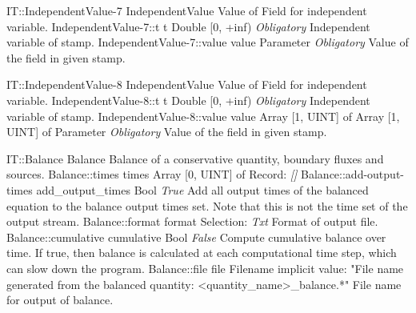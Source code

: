 \begin{TupleType}
	{IT::IndependentValue-7}
	{IndependentValue}
	{} %
	{} %
	{{{Value of Field for independent variable.}}}
		\RecKey
			{IndependentValue-7::t}
			{t}
			{{Double [0, +inf)}}
			{ \it{Obligatory} }
			{{{Independent variable of stamp.}}}
		\RecKey
			{IndependentValue-7::value}
			{value}
			{{Parameter}}
			{ \it{Obligatory} }
			{{{Value of the field in given stamp.}}}
\end{TupleType}
\begin{TupleType}
	{IT::IndependentValue-8}
	{IndependentValue}
	{} %
	{} %
	{{{Value of Field for independent variable.}}}
		\RecKey
			{IndependentValue-8::t}
			{t}
			{{Double [0, +inf)}}
			{ \it{Obligatory} }
			{{{Independent variable of stamp.}}}
		\RecKey
			{IndependentValue-8::value}
			{value}
			{{Array [1, UINT] of }{Array [1, UINT] of }{Parameter}}
			{ \it{Obligatory} }
			{{{Value of the field in given stamp.}}}
\end{TupleType}
\begin{RecordType}
	{IT::Balance}
	{Balance}
	{} %
	{} %
	{{{Balance of a conservative quantity, boundary fluxes and sources.}}}
		\RecKey
			{Balance::times}
			{times}
			{{Array [0, UINT] of }{Record}{: }}
			{ \it{[]} }
			{}
		\RecKey
			{Balance::add-output-times}
			{add{\_}output{\_}times}
			{{Bool}}
			{ \it{True} }
			{{{Add all output times of the balanced equation to the balance output times set. Note that this is not the time set of the output stream.}}}
		\RecKey
			{Balance::format}
			{format}
			{{Selection}{: }}
			{ \it{Txt} }
			{{{Format of output file.}}}
		\RecKey
			{Balance::cumulative}
			{cumulative}
			{{Bool}}
			{ \it{False} }
			{{{Compute cumulative balance over time. If true, then balance is calculated at each computational time step, which can slow down the program.}}}
		\RecKey
			{Balance::file}
			{file}
			{{Filename}}
			{implicit value: "{File name generated from the balanced quantity: {\textless}quantity{\_}name{\textgreater}{\_}balance.*}"}
			{{{File name for output of balance.}}}
\end{RecordType}
